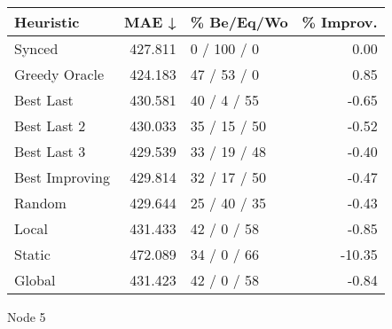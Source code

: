 \begin{tabular}{lrlr}
\toprule
\textbf{Heuristic} & \textbf{MAE ↓} & \textbf{\% Be/Eq/Wo} & \textbf{\% Improv.} \\
\midrule
            Synced &        427.811 &          0 / 100 / 0 &                0.00 \\
     Greedy Oracle &        424.183 &          47 / 53 / 0 &                0.85 \\
         Best Last &        430.581 &          40 / 4 / 55 &               -0.65 \\
       Best Last 2 &        430.033 &         35 / 15 / 50 &               -0.52 \\
       Best Last 3 &        429.539 &         33 / 19 / 48 &               -0.40 \\
    Best Improving &        429.814 &         32 / 17 / 50 &               -0.47 \\
            Random &        429.644 &         25 / 40 / 35 &               -0.43 \\
             Local &        431.433 &          42 / 0 / 58 &               -0.85 \\
            Static &        472.089 &          34 / 0 / 66 &              -10.35 \\
            Global &        431.423 &          42 / 0 / 58 &               -0.84 \\
\bottomrule
\end{tabular}
\caption{Node 5}
\label{tab:iid_lr05_le2_bs4_5}
